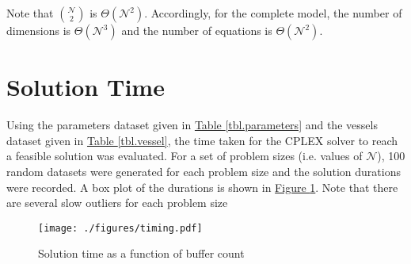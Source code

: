 Note that ${{\mathcal{N}}\choose{2}}$ is $\Theta \left( \mathcal{N}^2 \right)$.
Accordingly, for the complete model, the number of dimensions is 
$\Theta \left( \mathcal{N}^3 \right)$ and the number of equations is
$\Theta \left( \mathcal{N}^2 \right)$.

\section{Solution Time}\label{S.soltime}
Using the parameters dataset given in 
\hyperref[tbl.parameters]{Table \ref*{tbl.parameters}} and the vessels dataset
given in \hyperref[tbl.vessel]{Table \ref*{tbl.vessel}}, the time taken for
the CPLEX solver to reach a feasible solution was evaluated.
For a set of problem sizes (i.e. values of $\mathcal{N}$), 100 random datasets
were generated for each problem size and the solution durations were recorded.
A box plot of the durations is shown in 
\hyperref[fig.timing]{Figure \ref*{fig.timing}}.
Note that there are several slow outliers for each problem size


\begin{figure}
    \centering
    \texttt{[image: ./figures/timing.pdf]}
    \caption{Solution time as a function of buffer count}
    \label{fig.timing}
\end{figure}

